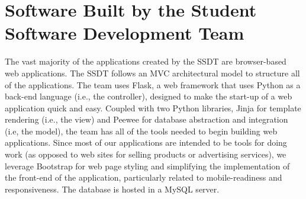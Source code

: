 
\section{Software Built by the Student Software Development Team}
The vast majority of the applications created by the SSDT are browser-based web applications. The SSDT follows an MVC architectural model to structure all of the applications. The team uses Flask, a web framework that uses Python as a back-end language (i.e., the controller), designed to make the start-up of a web application quick and easy. Coupled with two Python libraries, Jinja for template rendering (i.e., the view) and Peewee for database abstraction and integration (i.e, the model), the team has all of the tools needed to begin building web applications. Since most of our applications are intended to be tools for doing work (as opposed to web sites for selling products or advertising services), we leverage Bootstrap for web page styling and simplifying the implementation of the front-end of the application, particularly related to mobile-readiness and responsiveness. The database is hosted in a MySQL server. 

